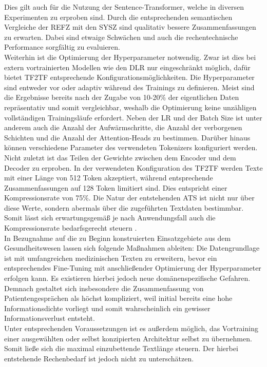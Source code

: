 \noindent
Dies gilt auch für die Nutzung der Sentence-Transformer, welche in diversen Experimenten zu erproben sind. Durch die entsprechenden semantischen Vergleiche der \ac{REFZ} mit den \ac{SYSZ} sind qualitativ bessere Zusammenfassungen zu erwarten. Dabei sind etwaige Schwächen und auch die rechentechnische Performance sorgfältig zu evaluieren.\\

\noindent
Weiterhin ist die Optimierung der Hyperparameter notwendig. Zwar ist dies bei extern vortrainierten Modellen wie den \ac{DLR} nur eingeschränkt möglich, dafür bietet \ac{TF2TF} entsprechende Konfigurationsmöglichkeiten. Die Hyperparameter sind entweder vor oder adaptiv während des Trainings zu definieren. Meist sind die Ergebnisse bereits nach der Zugabe von 10-20\% der eigentlichen Daten repräsentativ und somit vergleichbar, weshalb die Optimierung keine unzähligen vollständigen Trainingsläufe erfordert. Neben der \ac{LR} und der Batch Size ist unter anderem auch die Anzahl der Aufwärmschritte, die Anzahl der verborgenen Schichten und die Anzahl der Attention-Heads zu bestimmen. Darüber hinaus können verschiedene Parameter des verwendeten Tokenizers konfiguriert werden. Nicht zuletzt ist das Teilen der Gewichte zwischen dem Encoder und dem Decoder zu erproben. In der verwendeten Konfiguration des \ac{TF2TF} werden Texte mit einer Länge von 512 Token akzeptiert, während entsprechende Zusammenfassungen auf 128 Token limitiert sind. Dies entspricht einer Kompressionsrate von 75\%. Die Natur der entstehenden \ac{ATS} ist nicht nur über diese Werte, sondern abermals über die zugeführten Textdaten bestimmbar. Somit lässt sich erwartungsgemäß je nach Anwendungsfall auch die Kompressionsrate bedarfsgerecht steuern \cite[S.~14-15]{NIT19}.\\

\noindent
In Bezugnahme auf die zu Beginn konstruierten Einsatzgebiete aus dem Gesundheitswesen lassen sich folgende Maßnahmen ableiten: Die Datengrundlage ist mit umfangreichen medizinischen Texten zu erweitern, bevor ein entsprechendes Fine-Tuning mit anschließender Optimierung der Hyperparameter erfolgen kann. Es existieren hierbei jedoch neue domänenspezifische Gefahren. Demnach gestaltet sich insbesondere die Zusammenfassung von Patientengesprächen als höchst kompliziert, weil initial bereits eine hohe Informationsdichte vorliegt und somit wahrscheinlich ein gewisser Informationsverlust entsteht.\\

\noindent
Unter entsprechenden Voraussetzungen ist es außerdem möglich, das Vortraining einer ausgewählten oder selbst konzipierten Architektur selbst zu übernehmen. Somit ließe sich die maximal einzubettende Textlänge steuern. Der hierbei entstehende Rechenbedarf ist jedoch nicht zu unterschätzen.
